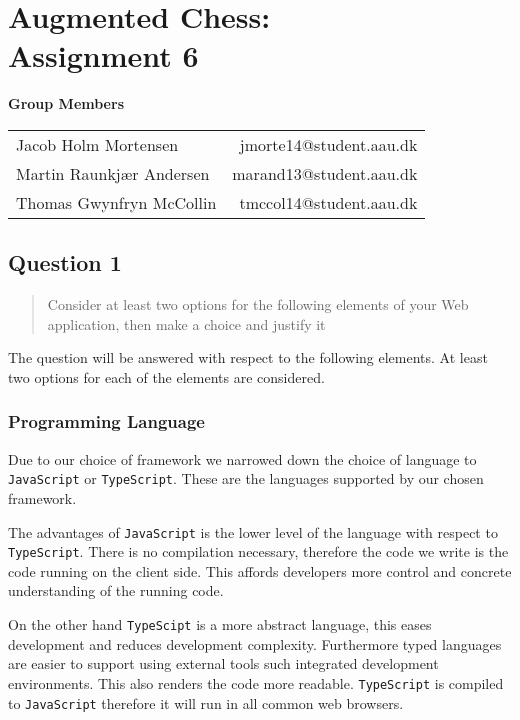 \documentclass[10pt,a4paper]{report}
\begin{document}
\chapter{Augmented Chess:\\ Assignment 6}

\begin{center}
{\Large \textbf{Group Members}}

\begin{tabular}{l r}
Jacob Holm Mortensen            &       jmorte14@student.aau.dk\\
Martin Raunkjær Andersen        &       marand13@student.aau.dk\\
Thomas Gwynfryn McCollin        &       tmccol14@student.aau.dk
\end{tabular}
\end{center}

\section{Question 1}
\begin{quote}
Consider at least two options for the following elements of your Web application, then make a choice and justify it
\end{quote}
The question will be answered with respect to the following elements. At least two options for each of the elements are considered.

\subsection{Programming Language}
Due to our choice of framework we narrowed down the choice of language to \texttt{JavaScript} or \texttt{TypeScript}. These are the languages supported by our chosen framework.

The advantages of \texttt{JavaScript} is the lower level of the language with respect to \texttt{TypeScript}. There is no compilation necessary, therefore the code we write is the code running on the client side. This affords developers more control and concrete understanding of the running code.

On the other hand \texttt{TypeScipt} is a more abstract language, this eases development and reduces development complexity. Furthermore typed languages are easier to support using external tools such integrated development environments. This also renders the code more readable. \texttt{TypeScript} is compiled to \texttt{JavaScript} therefore it will run in all common web browsers.
\end{document}
